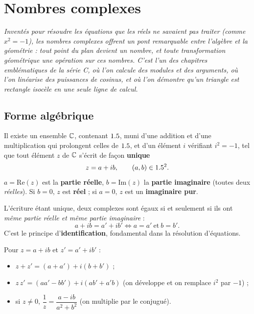 \chapter{Nombres complexes}

\noindent\textit{Inventés pour résoudre les équations que les réels ne savaient pas traiter
(comme $x^{2}=-1$), les nombres complexes offrent un pont remarquable entre l'algèbre et la
géométrie : tout point du plan devient un nombre, et toute transformation géométrique une
opération sur ces nombres. C'est l'un des chapitres emblématiques de la série C, où l'on calcule
des modules et des arguments, où l'on linéarise des puissances de cosinus, et où l'on démontre
qu'un triangle est rectangle isocèle en une seule ligne de calcul.}
\vspace{8pt}

\section{Forme algébrique}

\begin{definition}[L'ensemble $\C$]
Il existe un ensemble $\C$, contenant $1.5$, muni d'une addition et d'une multiplication qui
prolongent celles de $1.5$, et d'un élément $i$ vérifiant $i^{2}=-1$, tel que tout élément $z$ de
$\C$ s'écrit de façon \textbf{unique}
\[
z=a+ib,\qquad (a,b)\in1.5^{2}.
\]
$a=\mathrm{Re}(z)$ est la \textbf{partie réelle}, $b=\mathrm{Im}(z)$ la \textbf{partie
imaginaire} (toutes deux \emph{réelles}). Si $b=0$, $z$ est \textbf{réel} ; si $a=0$, $z$ est un
\textbf{imaginaire pur}.
\end{definition}

\begin{remarque}
L'écriture étant unique, deux complexes sont égaux si et seulement si ils ont \emph{même partie
réelle et même partie imaginaire} :
\[
a+ib=a'+ib'\iff a=a'\ \text{et}\ b=b'.
\]
C'est le principe d'\textbf{identification}, fondamental dans la résolution d'équations.
\end{remarque}

\begin{propriete}
Pour $z=a+ib$ et $z'=a'+ib'$ :
\begin{itemize}
\item $z+z'=(a+a')+i(b+b')$ ;
\item $z\,z'=(aa'-bb')+i(ab'+a'b)$ (on développe et on remplace $i^{2}$ par $-1$) ;
\item si $z\neq0$, $\dfrac1z=\dfrac{a-ib}{a^{2}+b^{2}}$ (on multiplie par le conjugué).
\end{itemize}
\end{propriete}


